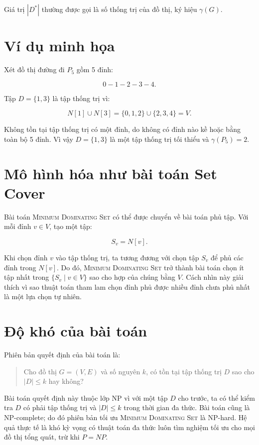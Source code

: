 \documentclass[12pt, a4paper]{report}
\newcommand{\MDS}{\textsc{Minimum Dominating Set}}
\begin{document}
Giá trị $|D^*|$ thường được gọi là số thống trị của đồ thị, ký hiệu $\gamma(G)$.

\section{Ví dụ minh họa}

Xét đồ thị đường đi $P_5$ gồm 5 đỉnh:

\[
  0 - 1 - 2 - 3 - 4.
\]

Tập $D=\{1,3\}$ là tập thống trị vì:

\[
  N[1]\cup N[3]=\{0,1,2\}\cup\{2,3,4\}=V.
\]

Không tồn tại tập thống trị có một đỉnh, do không có đỉnh nào kề hoặc bằng toàn bộ 5 đỉnh. Vì vậy
$D=\{1,3\}$ là một tập thống trị tối thiểu và $\gamma(P_5)=2$.

\section{Mô hình hóa như bài toán Set Cover}

Bài toán \MDS{} có thể được chuyển về bài toán phủ tập. Với mỗi đỉnh $v\in V$, tạo một tập:

\begin{equation}
  S_v=N[v].
\end{equation}

Khi chọn đỉnh $v$ vào tập thống trị, ta tương đương với chọn tập $S_v$ để phủ các đỉnh trong $N[v]$.
Do đó, \MDS{} trở thành bài toán chọn ít tập nhất trong $\{S_v \mid v\in V\}$ sao cho hợp của chúng
bằng $V$. Cách nhìn này giải thích vì sao thuật toán tham lam chọn đỉnh phủ được nhiều đỉnh chưa phủ
nhất là một lựa chọn tự nhiên.

\section{Độ khó của bài toán}

Phiên bản quyết định của bài toán là:

\begin{quote}
  Cho đồ thị $G=(V,E)$ và số nguyên $k$, có tồn tại tập thống trị $D$ sao cho $|D|\leq k$ hay không?
\end{quote}

Bài toán quyết định này thuộc lớp NP vì với một tập $D$ cho trước, ta có thể kiểm tra $D$ có phải tập
thống trị và $|D|\leq k$ trong thời gian đa thức. Bài toán cũng là NP-complete; do đó phiên bản tối ưu
\MDS{} là NP-hard. Hệ quả thực tế là khó kỳ vọng có thuật toán đa thức luôn tìm nghiệm tối ưu cho mọi
đồ thị tổng quát, trừ khi $P=NP$.
\end{document}
